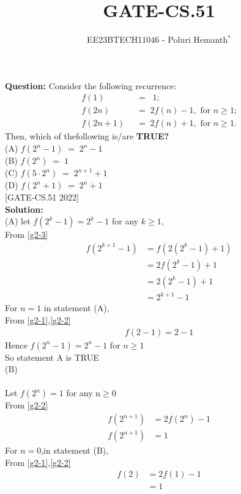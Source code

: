 \documentclass[journal,12pt,twocolumn]{IEEEtran}
\theoremstyle{remark}
\begin{document}

\vspace{3cm}

\title{GATE-CS.51}
\author{EE23BTECH11046 - Poluri Hemanth$^{*}$}
\maketitle
\textbf{Question:}
Consider the following recurrence:
\begin{align}
	f(1)\;\;&=\;\;1;\label{g2-1}\\
	 f(2n)\;\;&=\;2f(n)-1,\text{  for $n\geq$1;}\label{g2-2}\\
	 f(2n+1)\;\;&=\;2f(n)+1,\text{  for $n\geq$1.}\label{g2-3}
\end{align}
Then, which of thefollowing is/are \textbf{TRUE?}\\
(A) $f(2^n-1)\;=\;2^n-1$\\
(B) $f(2^n)\;=\;1$\\
(C) $f(5\cdot2^n)\;=\;2^{n+1}+1$\\
(D) $f(2^n+1)\;=\;2^n+1$\\
\hfill{[GATE-CS.51 2022]}\\
\textbf{Solution:}\\
(A)
let $f(2^k-1)=2^k-1$ for any $k\geq1$,\\
From \eqref{g2-3}
\begin{align}
	f(2^{k+1}-1)&=f(2(2^k-1)+1)\label{1}\\
	&=2f(2^k-1)+1\\
        &=2(2^k-1)+1\\
        &=2^{k+1}-1
\end{align}
For $n=1$ in statement (A),\\
From \eqref{g2-1},\eqref{g2-2}
\begin{align}
	f(2-1)=2-1
\end{align}
Hence $f(2^n-1)=2^n-1$ for $n\geq1$\\
So statement A is TRUE\\
(B)\\
\\Let $f(2^n)=1$ for any n$\geq$0\\
From \eqref{g2-2}
\begin{align}
	f(2^{n+1})&=2f(2^n)-1\\
	f(2^{n+1})&=1
\end{align}
For $n=0$,in statement (B),\\
From \eqref{g2-1},\eqref{g2-2}
\begin{align}
	f(2)&=2f(1)-1\\
	&=1
\end{align}
\end{document}
